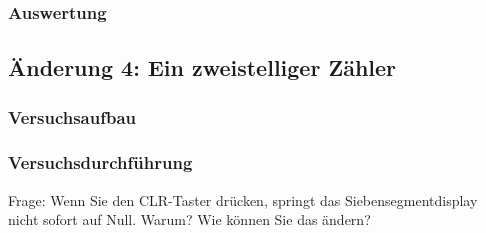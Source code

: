 \documentclass[12pt,a4paper]{article}
\begin{document}
\subsubsection*{Auswertung}

\subsection{Änderung 4: Ein zweistelliger Zähler}

\subsubsection*{Versuchsaufbau}

\subsubsection*{Versuchsdurchführung}
Frage: Wenn Sie den CLR-Taster drücken, springt das Siebensegmentdisplay nicht sofort auf Null. Warum? Wie können Sie das ändern?
\end{document}
